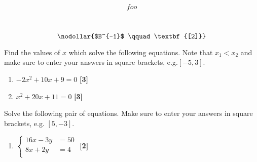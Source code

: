 \documentclass[a4paper, leqno, 12pt]{article}
\newenvironment{top_enumerate}{
\begin{enumerate}
  \setlength{\itemsep}{2em}
  \setlength{\topsep}{-0pt}
  \setlength{\partopsep}{-0pt}
}{\end{enumerate}}
\newlength{\EqL}
\newlength{\RunL}
\newcommand{\EqContent}{foo}
\begin{document}
\begin{top_enumerate}
\begin{minipage}{\EqL}
	\begin{equation}
	\EqContent
	\end{equation}
	\end{minipage}
	\renewcommand{\EqContent}{\nodollar{$B^{-1}$
	\qquad\textbf{[2]}}}
	\settowidth{\EqL}{$\qquad\EqContent\qquad$}
	\setlength{\RunL}{\RunL+\EqL}
		{\setlength{\RunL}{0pt}
		\\}
		{}
	\begin{minipage}{\EqL}
	\begin{equation}
	\EqContent
	\end{equation}
	\end{minipage}
\item Find the values of $x$ which solve the following equations. Note that $x_1 < x_2$ and make sure to enter your answers in square brackets, e.g.$[-5,3]$.
 
\setcounter{equation}{0}  %
\begin{multicols}{2}
\begin{enumerate}
	\setlength{\topsep}{-0pt}
	\setlength{\partopsep}{-0pt}
	\setlength{\itemsep}{10pt}
			\item $-{2}x^2 + {10}x + {9} = 0$
	 \quad \textbf{[3]}
		\item $x^2 + {20}x + {11} = 0$
	 \quad \textbf{[3]}
\end{enumerate}\end{multicols}\item Solve the following pair of equations. Make sure to enter your answers in square brackets, e.g. $[5,-3]$.
 
\setcounter{equation}{0}  %
\begin{enumerate}
	\setlength{\topsep}{-0pt}
	\setlength{\partopsep}{-0pt}
	\setlength{\itemsep}{10pt}
			\item $\left\{\begin{aligned}
	{16}x - {3}y & = {50}\\
	{8}x + {2}y & = {4}\\
	\end{aligned}\right.$
	 \quad \textbf{[2]}
\end{enumerate}

\end{top_enumerate}
\end{document}
